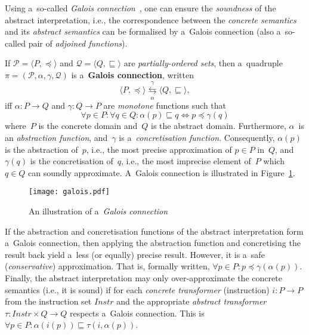 Using a~so-called \emph{Galois connection}~\cite{AILatticeModelCousot, wideningNarrowingCousot, savAI, staticAnalysisMoller, programAnalysisNielson, staticAnalysisRival}, one can ensure the \emph{soundness} of the abstract interpretation, i.e., the correspondence between the \emph{concrete semantics} and its \emph{abstract semantics} can be formalised by a~Galois connection (also a~so-called pair of \emph{adjoined functions}).
\begin{definition}
    If $ \mathcal{P} = \langle P, \preceq \rangle $ and $ \mathcal{Q} = \langle Q, \sqsubseteq \rangle $ are \emph{partially-ordered sets}, then a~quadruple $ \pi = (\mathcal{P}, \alpha, \gamma, \mathcal{Q}) $ is a~\textbf{Galois connection}, written 
    $$ 
        \langle P, \preceq \rangle \overset{\gamma}{\underset{\alpha}\leftrightarrows} \langle Q, \sqsubseteq \rangle,
    $$
    iff $ \alpha : P \rightarrow Q $ and $ \gamma : Q \rightarrow P $ are \emph{monotone} functions such that
    $$
        \forall p \in P : \forall q \in Q : \alpha(p) \sqsubseteq q \Longleftrightarrow p \preceq \gamma(q)
    $$
    where~$ P $ is the concrete domain and~$ Q $ is the abstract domain. Furthermore, $ \alpha $~is an \emph{abstraction function}, and~$ \gamma $ is a~\emph{concretisation function}. Consequently, $ \alpha(p) $ is the abstraction of~$ p $, i.e., the most precise approximation of $ p \in P $ in~$ Q $, and $ \gamma(q) $ is the concretisation of~$ q $, i.e., the most imprecise element of~$ P $ which $ q \in Q $ can soundly approximate. A~Galois connection is illustrated in Figure~\ref{fig:galois}.
\end{definition}

\begin{figure}[hbt]
    \centering
    \texttt{[image: galois.pdf]}
    \caption{An illustration of a~\emph{Galois connection}}
    \label{fig:galois}
\end{figure}

If the abstraction and concretisation functions of the abstract interpretation form a~Galois connection, then applying the abstraction function and concretising the result back yield a~less (or equally) precise result. However, it is a~safe (\emph{conservative}) approximation. That is, formally written, $ \forall p \in P : p \preceq \gamma(\alpha(p)) $. Finally, the abstract interpretation may only over-approximate the concrete semantics (i.e., it is sound) if for each \emph{concrete transformer} (instruction) $ i : P \rightarrow P $ from the instruction set $ Instr $ and the appropriate \emph{abstract transformer} $ \tau : Instr \times Q \rightarrow Q $ respects a~Galois connection. This is $ \forall p \in P : \alpha(i(p)) \sqsubseteq \tau(i, \alpha(p)) $.

